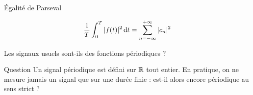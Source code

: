 \documentclass[aspectratio=43,10pt]{beamer}
\newcommand{\slidefig}[2]{%
\begin{center}
\resizebox{#1}{!}{}
\end{center}
}
\begin{document}
\begin{frame}{Égalité de Parseval}
    \begin{theorem}[Parseval]
        \[
            \frac1T\int_0^T |f(t)|^2\,{\rm d} t = \sum_{n=-\infty}^{+\infty}|c_n|^2
        \]
    \end{theorem}
    \slidefig{\textwidth}{parseval-illustration.tex}
\end{frame}

\begin{frame}{Les signaux usuels sont-ils des fonctions périodiques ?}
    \slidefig{\textwidth}{windowed-sine.tex}
    \begin{alertblock}{Question}
        Un signal périodique est défini sur ${\mathbb{R}}$ tout entier. En
        pratique, on ne mesure jamais un signal que sur une durée
        finie : est-il alors encore périodique au sens strict ?
    \end{alertblock}
\end{frame}
\end{document}
